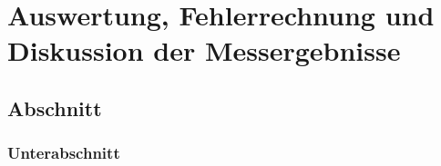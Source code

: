 \chapter{Auswertung, Fehlerrechnung und Diskussion der Messergebnisse}
\section{Abschnitt}
\subsection{Unterabschnitt}
